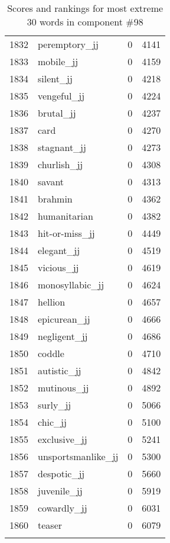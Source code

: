 \begin{longtable}[!htbp]{| rlr@{.}l |}
    1832 & peremptory\_jj & 0 & 4141 \\
    1833 & mobile\_jj & 0 & 4159 \\
    1834 & silent\_jj & 0 & 4218 \\
    1835 & vengeful\_jj & 0 & 4224 \\
    1836 & brutal\_jj & 0 & 4237 \\
    1837 & card & 0 & 4270 \\
    1838 & stagnant\_jj & 0 & 4273 \\
    1839 & churlish\_jj & 0 & 4308 \\
    1840 & savant & 0 & 4313 \\
    1841 & brahmin & 0 & 4362 \\
    1842 & humanitarian & 0 & 4382 \\
    1843 & hit-or-miss\_jj & 0 & 4449 \\
    1844 & elegant\_jj & 0 & 4519 \\
    1845 & vicious\_jj & 0 & 4619 \\
    1846 & monosyllabic\_jj & 0 & 4624 \\
    1847 & hellion & 0 & 4657 \\
    1848 & epicurean\_jj & 0 & 4666 \\
    1849 & negligent\_jj & 0 & 4686 \\
    1850 & coddle & 0 & 4710 \\
    1851 & autistic\_jj & 0 & 4842 \\
    1852 & mutinous\_jj & 0 & 4892 \\
    1853 & surly\_jj & 0 & 5066 \\
    1854 & chic\_jj & 0 & 5100 \\
    1855 & exclusive\_jj & 0 & 5241 \\
    1856 & unsportsmanlike\_jj & 0 & 5300 \\
    1857 & despotic\_jj & 0 & 5660 \\
    1858 & juvenile\_jj & 0 & 5919 \\
    1859 & cowardly\_jj & 0 & 6031 \\
    1860 & teaser & 0 & 6079 \\
    \hline
    \caption{Scores and rankings for most extreme 30 words in component \#98} \\
\end{longtable}
